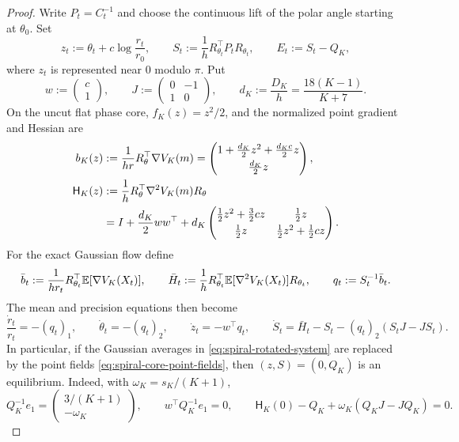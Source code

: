 \begin{proof}
Write $P_t=C_t^{-1}$ and choose the continuous lift of the polar angle starting at $\theta_0$.
Set
\begin{equation}
\label{eq:spiral-transverse-coordinates}
 z_t:=\theta_t+c\log\frac{r_t}{r_0},
 \qquad
 S_t:=\frac1hR_{\theta_t}^{\top}P_tR_{\theta_t},
 \qquad
 E_t:=S_t-Q_K,
\end{equation}
where $z_t$ is represented near $0$ modulo $\pi$.  Put
\[
 w:=\begin{pmatrix}c\\1\end{pmatrix},
 \qquad
 J:=\begin{pmatrix}0&-1\\1&0\end{pmatrix},
 \qquad
 d_K:=\frac{D_K}{h}=\frac{18(K-1)}{K+7}.
\]
On the uncut flat phase core, $f_K(z)=z^2/2$, and the normalized point gradient and Hessian are
\begin{align}
\label{eq:spiral-core-point-fields}
 b_K(z)
 &:=\frac1{hr}R_\theta^\top\nabla V_K(m)
 =\begin{pmatrix}
 1+\frac{d_K}{2}z^2+\frac{d_Kc}{2}z\\[1mm]
 \frac{d_K}{2}z
 \end{pmatrix},\\
 \mathsf H_K(z)
 &:=\frac1hR_\theta^\top\nabla^2V_K(m)R_\theta\notag\\
 &=I+\frac{d_K}{2}ww^\top
 +d_K\begin{pmatrix}
 \frac12z^2+\frac32cz&\frac12z\\[1mm]
 \frac12z&\frac12z^2+\frac12cz
 \end{pmatrix}.
\end{align}
For the exact Gaussian flow define
\[
 \bar b_t:=\frac1{hr_t}R_{\theta_t}^\top\mathbb{E}[\nabla V_K(X_t)],
 \qquad
 \bar H_t:=\frac1hR_{\theta_t}^\top\mathbb{E}[\nabla^2V_K(X_t)]R_{\theta_t},
 \qquad
 q_t:=S_t^{-1}\bar b_t.
\]
The mean and precision equations then become
\begin{equation}
\label{eq:spiral-rotated-system}
 \frac{\dot r_t}{r_t}=-(q_t)_1,
 \qquad
 \dot\theta_t=-(q_t)_2,
 \qquad
 \dot z_t=-w^\top q_t,
 \qquad
 \dot S_t=\bar H_t-S_t-(q_t)_2(S_tJ-JS_t).
\end{equation}
In particular, if the Gaussian averages in \eqref{eq:spiral-rotated-system} are replaced by the
point fields \eqref{eq:spiral-core-point-fields}, then $(z,S)=(0,Q_K)$ is an equilibrium.  Indeed,
with $\omega_K=s_K/(K+1)$,
\[
 Q_K^{-1}e_1=\begin{pmatrix}3/(K+1)\\-\omega_K\end{pmatrix},
 \qquad
 w^\top Q_K^{-1}e_1=0,
 \qquad
 \mathsf H_K(0)-Q_K+\omega_K(Q_KJ-JQ_K)=0.
\]


\end{proof}
